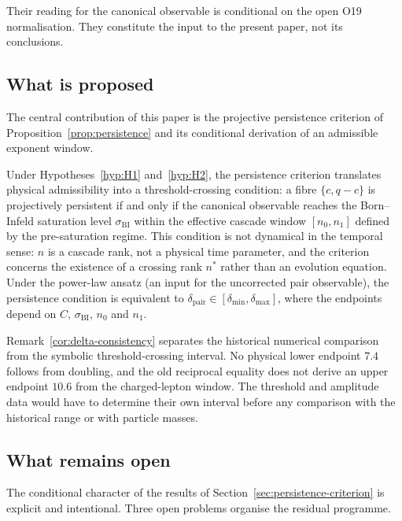 \documentclass[11pt,a4paper]{article}
\theoremstyle{definition}
\theoremstyle{remark}
\begin{document}
      Their reading for the canonical observable is conditional on the open O19 normalisation.
      They constitute the input to the present paper, not its conclusions.

    \subsection{What is proposed}
      \label{sec:proposed}

      The central contribution of this paper is the projective persistence
      criterion of Proposition~\ref{prop:persistence} and its conditional
      derivation of an admissible exponent window.

      Under Hypotheses~\ref{hyp:H1} and~\ref{hyp:H2}, the persistence
      criterion translates physical admissibility into a
      threshold-crossing condition: a fibre $\{c, q-c\}$ is projectively
      persistent if and only if the canonical observable reaches the
      Born--Infeld saturation level $\sigma_{\mathrm{BI}}$ within the
      effective cascade window $[n_0, n_1]$ defined by the
      pre-saturation regime.
      This condition is not dynamical in the temporal sense: $n$ is a
      cascade rank, not a physical time parameter, and the criterion
      concerns the existence of a crossing rank $n^*$ rather than an
      evolution equation.
      Under the power-law ansatz (an input for the uncorrected pair observable), the persistence
      condition is equivalent to
      $\delta_{\mathrm{pair}} \in [\delta_{\min}, \delta_{\max}]$, where
      the endpoints depend on $C$, $\sigma_{\mathrm{BI}}$, $n_0$ and $n_1$.

      Remark~\ref{cor:delta-consistency} separates the historical numerical comparison from
      the symbolic threshold-crossing interval.
      No physical lower endpoint $7.4$ follows from doubling, and the old reciprocal equality
      does not derive an upper endpoint $10.6$ from the charged-lepton window.
      The threshold and amplitude data would have to determine their own interval before any
      comparison with the historical range or with particle masses.

    \subsection{What remains open}
      \label{sec:open}

      The conditional character of the results of
      Section~\ref{sec:persistence-criterion} is explicit and intentional.
      Three open problems organise the residual programme.
\end{document}
